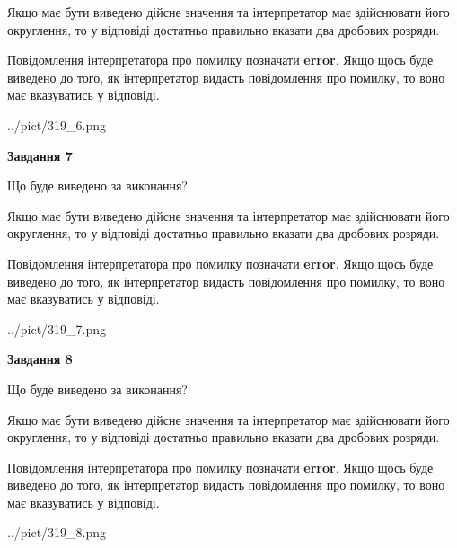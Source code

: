 \documentclass[12pt, ukrainian]{article}
\begin{document}
{\begin {Large}
Якщо має бути виведено дійсне значення та інтерпретатор має здійснювати його округлення, 
то у відповіді достатньо правильно вказати два дробових розряди.

Повідомлення інтерпретатора про помилку позначати \textbf{error}.
Якщо щось буде виведено до того, як інтерпретатор видасть повідомлення про помилку, 
то воно має вказуватись у відповіді. \par

\begin{center}
	{../pict/319_6.png}
\end{center}
\newpage

{\begin {center}\textbf{Завдання 7}\end {center}}\par
Що буде виведено за виконання? \par

Якщо має бути виведено дійсне значення та інтерпретатор має здійснювати його округлення, 
то у відповіді достатньо правильно вказати два дробових розряди.

Повідомлення інтерпретатора про помилку позначати \textbf{error}.
Якщо щось буде виведено до того, як інтерпретатор видасть повідомлення про помилку, 
то воно має вказуватись у відповіді. \par

\begin{center}
	{../pict/319_7.png}
\end{center}
\newpage

{\begin {center}\textbf{Завдання 8}\end {center}}\par
Що буде виведено за виконання? \par

Якщо має бути виведено дійсне значення та інтерпретатор має здійснювати його округлення, 
то у відповіді достатньо правильно вказати два дробових розряди.

Повідомлення інтерпретатора про помилку позначати \textbf{error}.
Якщо щось буде виведено до того, як інтерпретатор видасть повідомлення про помилку, 
то воно має вказуватись у відповіді. \par

\begin{center}
	{../pict/319_8.png}
\end{center}
\newpage


\end{Large}}
\end{document}
